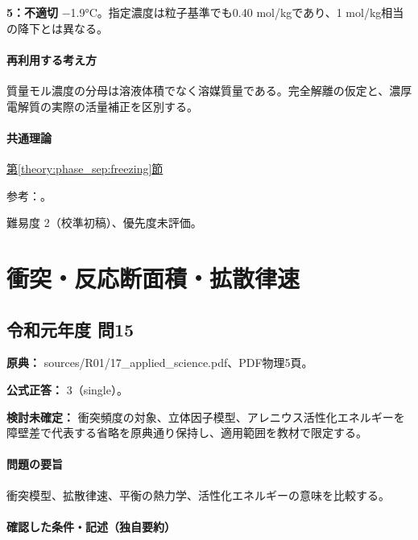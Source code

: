 \noindent\textbf{5：不適切} −1.9°C。指定濃度は粒子基準でも0.40 mol/kgであり、1 mol/kg相当の降下とは異なる。\par

\paragraph{再利用する考え方} 質量モル濃度の分母は溶液体積でなく溶媒質量である。完全解離の仮定と、濃厚電解質の実際の活量補正を区別する。

\paragraph{共通理論} \hyperref[theory:phase_sep:freezing]{第\ref*{theory:phase_sep:freezing}節}

\par 参考：\cite{mit_colligative2008}。

\par 難易度 2（校準初稿）、優先度未評価。

\section{衝突・反応断面積・拡散律速}

\subsection{令和元年度 問15}
\label{q:r01-reg-applied-15}

\noindent\textbf{原典：} sources/R01/17\_applied\_science.pdf、PDF物理5頁。

\textbf{公式正答：} 3（single）。

\par\textbf{検討未確定：} 衝突頻度の対象、立体因子模型、アレニウス活性化エネルギーを障壁差で代表する省略を原典通り保持し、適用範囲を教材で限定する。

\paragraph{問題の要旨} 衝突模型、拡散律速、平衡の熱力学、活性化エネルギーの意味を比較する。

\paragraph{確認した条件・記述（独自要約）}\mbox{}\par

